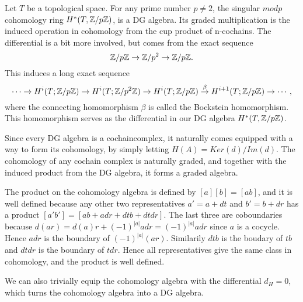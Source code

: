 
\begin{example}
Let $T$ be a topological space. For any prime number $p\neq 2$, the singular $mod p$ cohomology ring $H^*(T, \mathbb{Z}/p\mathbb{Z})$, is a DG algebra. Its graded multiplication is the induced operation in cohomology from the cup product of n-cochains. The differential is a bit more involved, but comes from the exact sequence
\begin{equation*}
\mathbb{Z}/p\mathbb{Z} \rightarrow \mathbb{Z}/p^2 \rightarrow \mathbb{Z}/p\mathbb{Z}.
\end{equation*}    
This induces a long exact sequence 
\begin{equation*}
    \cdots \rightarrow H^i(T; \mathbb{Z}/p\mathbb{Z}) \rightarrow H^i(T; \mathbb{Z}/p^2\mathbb{Z}) \rightarrow H^i(T; \mathbb{Z}/p\mathbb{Z}) \overset{\beta}\rightarrow H^{i+1}(T; \mathbb{Z}/p\mathbb{Z}) \rightarrow \cdots, 
\end{equation*}
where the connecting homomorphism $\beta$ is called the Bockstein homomorphism. This homomorphism serves as the differential in our DG algebra $H^*(T, \mathbb{Z}/p\mathbb{Z})$. 
\end{example}




\begin{example}
Since every DG algebra is a cochaincomplex, it naturally comes equipped with a way to form its cohomology, by simply letting $H(A)=Ker(d)/Im(d)$. The cohomology of any cochain complex is naturally graded, and together with the induced product from the DG algebra, it forms a graded algebra. 
    
The product on the cohomology algebra is defined by $[a][b]=[ab]$, and it is well defined because any other two representatives $a'=a+dt$ and $b'=b+dr$ has a product $[a'b']=[ab+adr+dtb+dtdr]$. The last three are coboundaries because $d(ar)=d(a)r + (-1)^{|a|}adr = (-1)^{|a|}adr$ since $a$ is a cocycle. Hence $adr$ is the boundary of $(-1)^{|a|}(ar)$. Similarily $dtb$ is the boudary of $tb$ and $dtdr$ is the boundary of $tdr$. Hence all representatives give the same class in cohomology, and the product is well defined. 
    
We can also trivially equip the cohomology algebra with the differential $d_H=0$, which turns the cohomology algebra into a DG algebra. 
\end{example}

